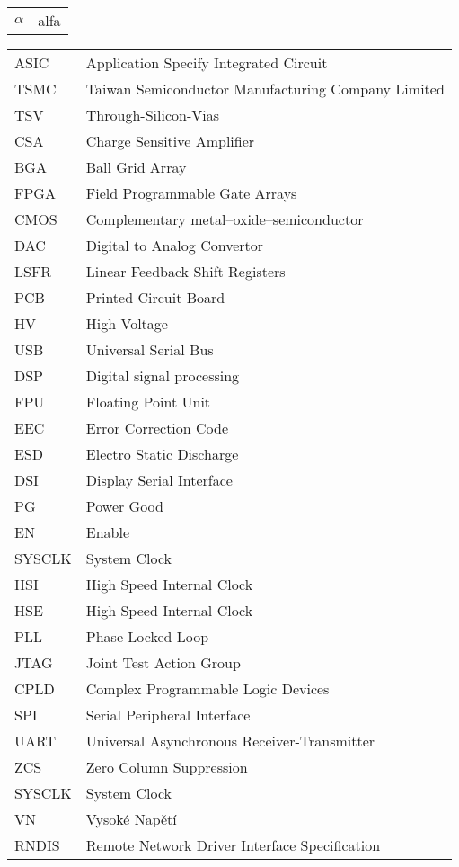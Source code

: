 \begin{tabular}{ l  l }
	
	$\alpha$ 			& alfa 				\\
	
\end{tabular}

\begin{tabular}{ l  l }
	
	ASIC & Application Specify Integrated Circuit \\
	TSMC & Taiwan Semiconductor Manufacturing Company Limited \\ 
	TSV	 & Through-Silicon-Vias \\
	CSA & Charge Sensitive Amplifier \\
	BGA & Ball Grid Array \\
	FPGA & Field Programmable Gate Arrays \\
	CMOS & Complementary metal–oxide–semiconductor \\
	DAC & Digital to Analog Convertor \\
	LSFR & Linear Feedback Shift Registers \\
	PCB & Printed Circuit Board \\
	HV & High Voltage \\
	USB & Universal Serial Bus \\
	DSP & Digital signal processing \\
	FPU & Floating Point Unit \\
	EEC & Error Correction Code \\
	ESD & Electro Static Discharge \\
	DSI & Display Serial Interface \\
	PG & Power Good \\
	EN & Enable \\
	SYSCLK & System Clock \\
	HSI & High Speed Internal Clock \\
	HSE & High Speed Internal Clock \\
	PLL & Phase Locked Loop \\
	JTAG & Joint Test Action Group \\
	CPLD & Complex Programmable Logic Devices \\
	SPI & Serial Peripheral Interface \\
	UART & Universal Asynchronous Receiver-Transmitter \\
	ZCS & Zero Column Suppression \\
	SYSCLK & System Clock \\
	VN & Vysoké Napětí \\
	RNDIS & Remote Network Driver Interface Specification \\
	
	
		
\end{tabular}